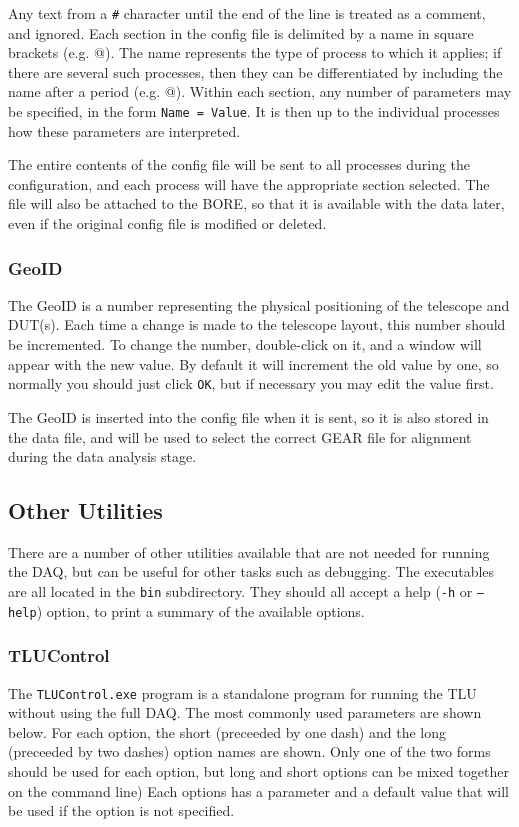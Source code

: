 Any text from a \texttt{\#} character until the end of the line is treated as a comment, and
ignored.  
Each section in the config file is delimited by a name in square brackets
(e.g. \verb@[RunControl]@).  
The name represents the type of process to which it applies; if there
are several such processes, then they can be differentiated by including the name after a period
(e.g. @).  
Within each section, any number of parameters may be specified,
in the form \mbox{\texttt{Name = Value}}.  
It is then up to the individual processes how these
parameters are interpreted.

The entire contents of the config file will be sent to all processes during the configuration, and
each process will have the appropriate section selected.  
The file will also be attached to the
\gls{BORE}, so that it is available with the data later, even if the original config file is
modified or deleted.

\subsubsection{GeoID}\label{sec:GeoID}
The GeoID is a number representing the physical positioning of the telescope and DUT(s).
Each time a change is made to the telescope layout, this number should be incremented.
To change the number, double-click on it, and a window will appear with the new value.
By default it will increment the old value by one, so normally you should just click \texttt{OK},
but if necessary you may edit the value first.

The GeoID is inserted into the config file when it is sent, so it is also stored in the data file,
and will be used to select the correct GEAR file for alignment during the data analysis stage.



\subsection{Other Utilities}
There are a number of other utilities available that are not needed for running the DAQ,
but can be useful for other tasks such as debugging.
The executables are all located in the \texttt{bin} subdirectory.
They should all accept a help (\texttt{-h} or \texttt{--help}) option,
to print a summary of the available options.

\subsubsection{TLUControl}
\label{sec:tlucontrol}
The \texttt{TLUControl.exe} program is a standalone program for running the TLU without using the
full DAQ. The most commonly used parameters are shown below. 
For each option, the short (preceeded by one dash) and the long (preceeded by two dashes) option names are shown. 
Only one of the two forms should be used for each option, but long and short options can be mixed together on the command line)
Each options has a parameter and a default value that will be used if the option is not specified.

